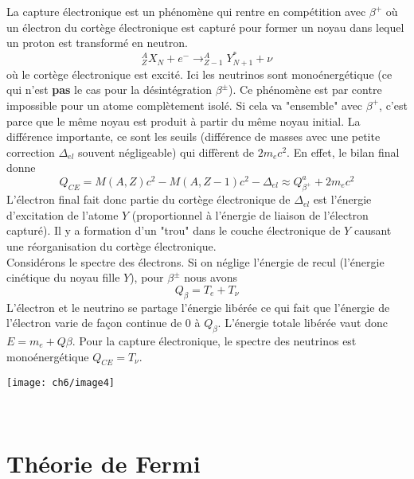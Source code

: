 La capture électronique est un phénomène qui rentre en compétition avec $\beta^+$ où un électron du cortège
électronique est capturé pour former un noyau dans lequel un proton est transformé en neutron. 
\begin{equation}
^A_ZX_N+e^-\to ^A_{Z-1}Y^*_{N+1}+\nu
\end{equation}
où le cortège électronique est excité. Ici les neutrinos sont monoénergétique (ce qui n'est \textbf{pas} le cas
pour la désintégration $\beta^\pm$). Ce phénomène est par contre impossible pour un atome complètement isolé.
Si cela va "ensemble" avec $\beta^+$, c'est parce que le même noyau est produit à partir du même noyau initial. 
La différence importante, ce sont les seuils (différence de masses avec une petite correction $\Delta_{el}$ souvent
négligeable) qui diffèrent de $2m_ec^2$. En effet, le bilan final donne
\begin{equation}
Q_{CE} = M(A,Z)c^2-M(A,Z-1)c^2-\Delta_{el}\approx Q_{\beta^+}^a + 2m_ec^2
\end{equation}
L'électron final fait donc partie du cortège électronique de $\Delta_{el}$ est l'énergie d'excitation de l'atome
$Y$ (proportionnel à l'énergie de liaison de l'électron capturé). Il y a formation d'un "trou" dans le couche
électronique de $Y$ causant une réorganisation du cortège électronique.\\

Considérons le spectre des électrons. Si on néglige l'énergie de recul (l'énergie cinétique du noyau fille $Y$), 
pour $\beta^\pm$ nous avons
\begin{equation}
Q_\beta = T_e+T_\nu
\end{equation}
L'électron et le neutrino se partage l'énergie libérée ce qui fait que l'énergie de l'électron varie de façon
continue de 0 à $Q_\beta$. L'énergie totale libérée vaut donc $E=m_e+Q\beta$. Pour la capture électronique, le
spectre des neutrinos est monoénergétique $Q_{CE} = T_\nu$.

\newpage
\begin{center}
	\texttt{[image: ch6/image4]}
\end{center}\ 

\section{Théorie de Fermi}

